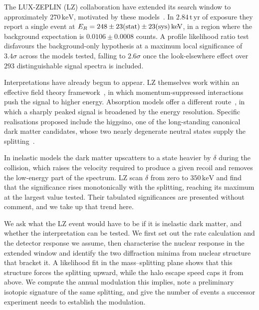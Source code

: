 \documentclass[aps,prl,twocolumn,superscriptaddress,nofootinbib,floatfix]{revtex4-2}
\newcommand{\keV}{\ensuremath{\,\mathrm{keV}}}
\newcommand{\tyr}{\ensuremath{\,\mathrm{t\,yr}}}
\newcommand{\ER}{\ensuremath{E_R}}
\begin{document}
The LUX-ZEPLIN (LZ) collaboration have extended its search window to approximately $270\keV$, motivated by these models~\cite{LZ:2026axp}. 
In $2.84\tyr$ of exposure they report a single event at $\ER = 248\pm23({\rm stat})\pm23({\rm sys})\keV$, in a region where the background expectation is $0.0106\pm0.0008$ counts. 
A profile likelihood ratio test disfavours the background-only hypothesis at a maximum local significance of $3.4\sigma$ across the models tested, 
falling to $2.6\sigma$ once the look-elsewhere effect over $293$ distinguishable signal spectra is included.

Interpretations have already begun to appear. LZ themselves work within an effective field theory framework~\cite{Fan:2010gt,Fitzpatrick:2012ix}, in which momentum-suppressed interactions push the signal to higher energy. Absorption models offer a different route~\cite{Lou:2026idn}, in which a sharply peaked signal is broadened by the energy resolution. Specific realisations proposed include the higgsino, one of the long-standing canonical dark matter candidates, whose two nearly degenerate neutral states supply the splitting~\cite{Fan:2026kxx,Freese:2026sga, Pospelov:2026ewn}.
 
In inelastic models the dark matter upscatters to a state heavier by $\delta$ during the collision, which raises the velocity required to produce a given recoil and removes the low-energy part of the spectrum. LZ scan $\delta$ from zero to $350\keV$ and find that the significance rises monotonically with the splitting, reaching its maximum at the largest value tested. Their tabulated significances are presented without comment, and we take up that trend here.

We ask what the LZ event would have to be if it is inelastic dark matter, and whether the interpretation can be tested. We first set out the rate calculation and the detector response we assume, then characterise the nuclear response in the extended window and identify the two diffraction minima from nuclear structure that bracket it. 
A likelihood fit in the mass--splitting plane shows that this structure forces the splitting upward, while the halo escape speed caps it from above.
We compute the annual modulation this implies, note a preliminary isotopic signature of the same splitting, and give the number of events a successor experiment needs to establish the modulation.
\end{document}
